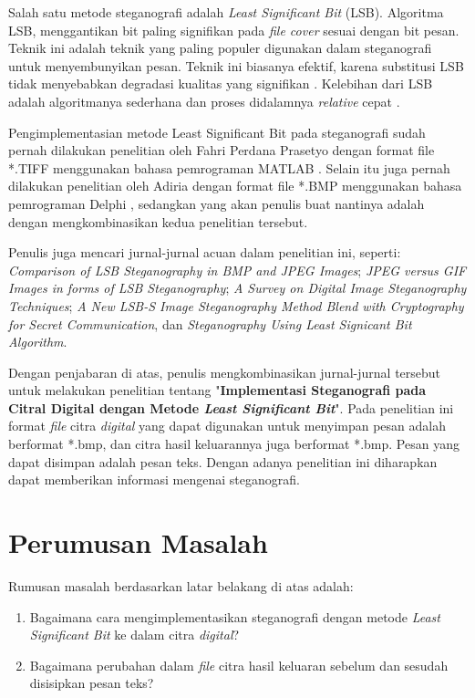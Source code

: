 Salah satu metode steganografi adalah \emph{Least Significant Bit} (LSB). Algoritma LSB, menggantikan bit paling signifikan pada \emph{file cover} sesuai dengan bit pesan. Teknik ini adalah teknik yang paling populer digunakan dalam steganografi untuk menyembunyikan pesan. Teknik ini biasanya efektif, karena substitusi LSB tidak menyebabkan degradasi kualitas yang signifikan \cite{joshi}. Kelebihan dari LSB adalah algoritmanya sederhana dan proses didalamnya \emph{relative} cepat \cite{pavani}.

Pengimplementasian metode Least Significant Bit pada steganografi sudah pernah dilakukan penelitian oleh Fahri Perdana Prasetyo dengan format file *.TIFF menggunakan bahasa pemrograman MATLAB \cite{prasetyo}. Selain itu juga pernah dilakukan penelitian oleh Adiria dengan format file *.BMP menggunakan bahasa pemrograman Delphi \cite{adiria}, sedangkan yang akan penulis buat nantinya adalah dengan mengkombinasikan kedua penelitian tersebut.

Penulis juga mencari jurnal-jurnal acuan dalam penelitian ini, seperti: \emph{Comparison of LSB Steganography in BMP and JPEG Images}; \emph{JPEG versus GIF Images in forms of LSB Steganography}; \emph{A Survey on Digital Image Steganography Techniques}; \emph{ A New LSB-S Image Steganography Method Blend with Cryptography for Secret Communication}, dan \emph{Steganography Using Least Signicant Bit Algorithm}. 

Dengan penjabaran di atas, penulis mengkombinasikan jurnal-jurnal tersebut untuk melakukan penelitian tentang "\textbf{Implementasi Steganografi pada Citral Digital dengan Metode \emph{Least Significant Bit}}". Pada penelitian ini format \emph{file} citra \emph{digital} yang dapat digunakan untuk menyimpan pesan adalah berformat *.bmp, dan citra hasil keluarannya juga berformat *.bmp. Pesan yang dapat disimpan adalah pesan teks. Dengan adanya penelitian ini diharapkan dapat memberikan informasi mengenai steganografi.

\section{Perumusan Masalah}
Rumusan masalah berdasarkan latar belakang di atas adalah:
\begin{enumerate}
	\item Bagaimana cara mengimplementasikan steganografi dengan metode \emph{Least Significant Bit} ke dalam citra \emph{digital}?
	\item Bagaimana perubahan dalam \emph{file} citra hasil keluaran sebelum dan sesudah disisipkan pesan teks?
\end{enumerate}


